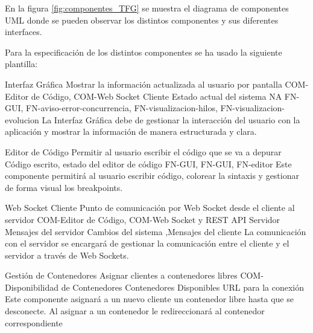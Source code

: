 En la figura \ref{fig:componentes_TFG} se muestra el diagrama de componentes UML \cite{Cook2017} donde se pueden observar los distintos componentes y sus diferentes interfaces.


Para la especificación de los distintos componentes se ha usado la siguiente plantilla: 

\printcomptemplate
\begin{component}{Interfaz Gráfica}
{Mostrar la información actualizada al usuario por pantalla}
{COM-Editor de Código, COM-Web Socket Cliente} %
{Estado actual del sistema} %
{NA} %
{FN-GUI, FN-aviso-error-concurrencia, FN-visualizacion-hilos, FN-visualizacion-evolucion} %
La Interfaz Gráfica debe de gestionar la interacción del usuario con la aplicación y mostrar la información de manera estructurada y clara. %
\end{component}

\begin{component}{Editor de Código}
    {Permitir al usuario escribir el código que se va a depurar}
    {\NA} %
    {\NA} %
    {Código escrito, estado del editor de código} %
    {FN-GUI, FN-GUI, FN-editor} %
    Este componente permitirá al usuario escribir código, colorear la sintaxis y gestionar de forma visual los breakpoints. %
\end{component}

\begin{component}{Web Socket Cliente}
{Punto de comunicación por Web Socket desde el cliente al servidor}
{COM-Editor de Código, COM-Web Socket y REST API Servidor} %
{Mensajes del servidor} %
{Cambios del sistema ,Mensajes del cliente} %
{} %
La comunicación con el servidor se encargará de gestionar la comunicación entre el cliente y el servidor a través de Web Sockets. %
\end{component}


\begin{component}{Gestión de Contenedores}
{Asignar clientes a contenedores libres}
{COM-Disponibilidad de Contenedores} %
{Contenedores Disponibles} %
{URL para la conexión} %
{} %
Este componente asignará a un nuevo cliente un contenedor libre hasta que se desconecte. Al asignar a un contenedor le redireccionará al contenedor correspondiente %
\end{component}

